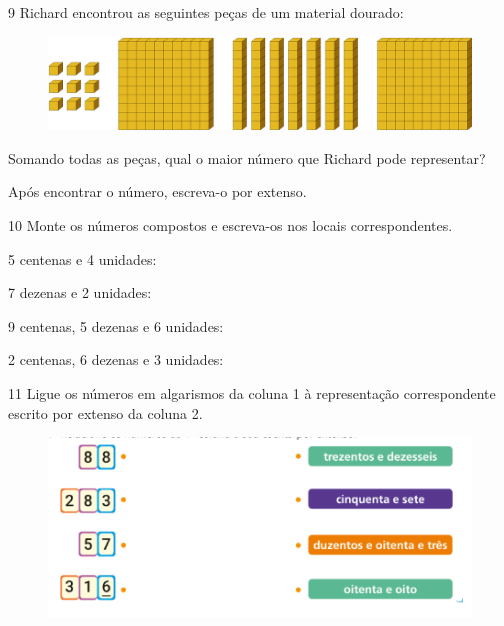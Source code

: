 \num{9} Richard encontrou as seguintes peças de um material dourado:

\begin{figure}[htpb!]
\includegraphics[width=\textwidth]{./media/image4.png}
\end{figure}

\item Somando todas as peças, qual o maior número que Richard pode representar? 

\item Após encontrar o número, escreva-o por extenso.

\num{10} Monte os números compostos e escreva-os nos locais correspondentes.

\begin{escolha}
\item 5 centenas e 4 unidades:
\reduline{504\hfill}

\item 7 dezenas e 2 unidades:
\reduline{72\hfill}

\item 9 centenas, 5 dezenas e 6 unidades:
\reduline{956\hfill}

\item 2 centenas, 6 dezenas e 3 unidades:
\reduline{263\hfill}

\end{escolha}

\num{11} Ligue os números em algarismos da coluna 1 
à representação correspondente escrito por extenso da coluna 2.

\begin{figure}[htpb!]
\centering
\includegraphics[width=\textwidth]{./media/image5.png}
\end{figure}


